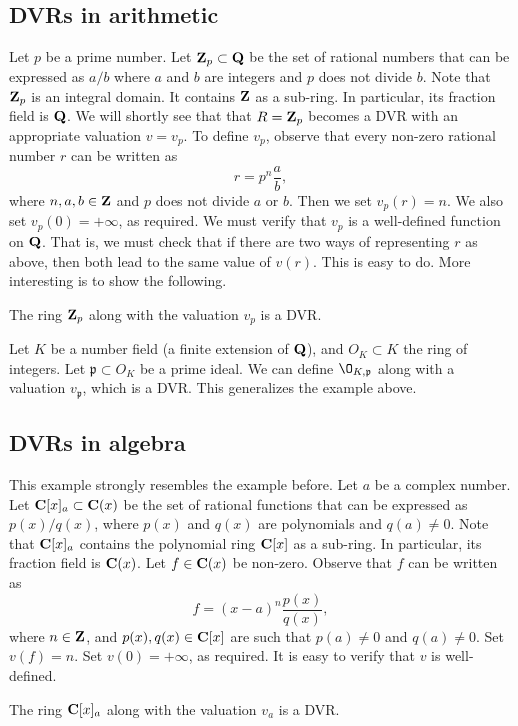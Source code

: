 \documentclass[12pt]{article}
\begin{document}
\subsection{DVRs in arithmetic}
Let $p$ be a prime number.
Let ${\bf Z}_p \subset {\bf Q}$ be the set of rational numbers that can be expressed as $a / b$ where $a$ and $b$ are integers and $p$ does not divide $b$.
Note that ${\bf Z}_p$ is an integral domain.
It contains ${\bf Z}$ as a sub-ring.
In particular, its fraction field is ${\bf Q}$.
We will shortly see that that $R = {\bf Z}_p$ becomes a DVR with an appropriate valuation $v = v_p$.
To define $v_p$, observe that every non-zero rational number $r$ can be written as
\[ r = p^n \frac{a}{b},\]
where $n, a, b \in {\bf Z}$ and $p$ does not divide $a$ or $b$.
Then we set $v_p(r) = n$.
We also set $v_p(0) = +\infty$, as required.
We must verify that $v_p$ is a well-defined function on ${\bf Q}$.
That is, we must check that if there are two ways of representing $r$ as above, then both lead to the same value of $v(r)$.
This is easy to do.
More interesting is to show the following.
\begin{proposition}
  The ring ${\bf Z}_p$ along with the valuation $v_p$ is a DVR.
\end{proposition}

\begin{remark}
  Let $K$ be a number field (a finite extension of ${\bf Q}$), and $O_K \subset K$ the ring of integers.
  Let $\mathfrak p \subset O_K$ be a prime ideal.
  We can define $\O_{K, \mathfrak p}$ along with a valuation $v_{\mathfrak p}$, which is a DVR.
  This generalizes the example above. 
\end{remark}

\subsection{DVRs in algebra}
This example strongly resembles the example before.
Let $a$ be a complex number.
Let ${\bf C}[x]_a \subset {\bf C}(x)$ be the set of rational functions
that can be expressed as $p(x)/q(x)$, where $p(x)$ and $q(x)$ are polynomials and $q(a) \neq 0$.
Note that ${\bf C}[x]_a$ contains the polynomial ring ${\bf C}[x]$ as a sub-ring.
In particular, its fraction field is ${\bf C}(x)$.
Let $f \in {\bf C}(x)$ be non-zero.
Observe that $f$ can be written as
\[ f = (x-a)^n \frac{p(x)}{q(x)},\]
where $n \in {\bf Z}$, and $p(x), q(x) \in {\bf C}[x]$ are such that $p(a) \neq 0$ and $q(a) \neq 0$.
Set $v(f) = n$.
Set $v(0) = +\infty$, as required.
It is easy to verify that $v$ is well-defined.
\begin{proposition}
  The ring ${\bf C}[x]_a$ along with the valuation $v_a$ is a DVR.
\end{proposition}
\end{document}
